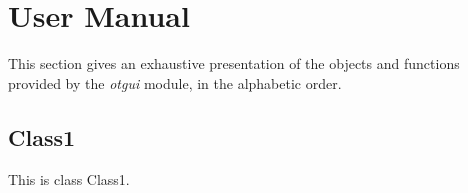 % 

\section{User Manual}

This section gives an exhaustive presentation of the objects and functions provided by the \textit{otgui} module, in the alphabetic order.


\subsection{Class1}

This is class Class1.

